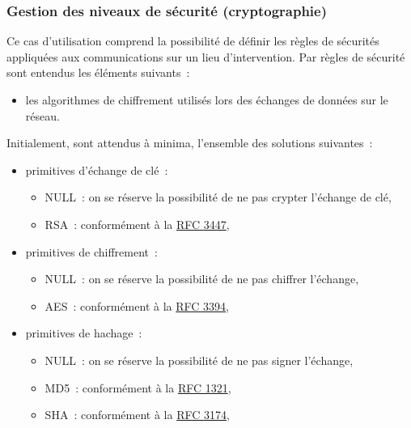 \subsubsection{Gestion des niveaux de sécurité (cryptographie)}
Ce cas d'utilisation comprend la possibilité de définir les règles de sécurités appliquées aux communications sur un lieu d'intervention.
Par règles de sécurité sont entendus les éléments suivants~:
\begin{itemize}
	\item les algorithmes de chiffrement utilisés lors des échanges de données sur le réseau.
\end{itemize}
Initialement, sont attendus à minima, l'ensemble des solutions suivantes~:
\begin{itemize}
	\item primitives d'échange de clé~:
	\begin{itemize}
		\item NULL~: on se réserve la possibilité de ne pas crypter l'échange de clé,
		\item RSA~: conformément à la \href{http://tools.ietf.org/html/rfc3447}{RFC 3447},
	\end{itemize}
	\item primitives de chiffrement~:
	\begin{itemize}
		\item NULL~: on se réserve la possibilité de ne pas chiffrer l'échange,
		\item AES~: conformément à la \href{http://tools.ietf.org/html/rfc3394}{RFC 3394},
	\end{itemize}
	\item primitives de hachage~:
	\begin{itemize}
		\item NULL~: on se réserve la possibilité de ne pas signer l'échange,
		\item MD5~: conformément à la \href{http://tools.ietf.org/html/rfc1321}{RFC 1321},
		\item SHA~: conformément à la \href{http://tools.ietf.org/html/rfc3174}{RFC 3174},
	\end{itemize}
\end{itemize}
